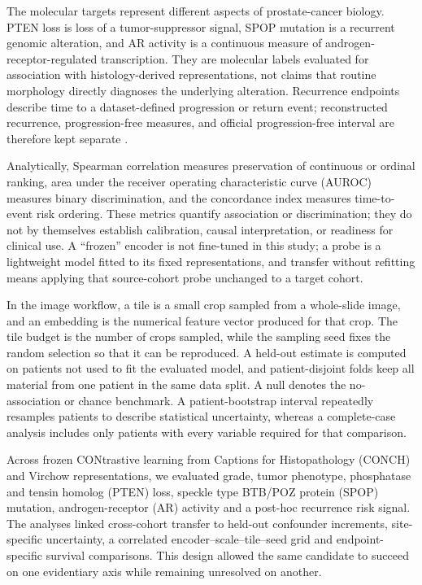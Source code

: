 The molecular targets represent different aspects of prostate-cancer biology. PTEN loss is
loss of a tumor-suppressor signal, SPOP mutation is a recurrent genomic alteration, and AR
activity is a continuous measure of androgen-receptor-regulated transcription. They are
molecular labels evaluated for association with histology-derived representations, not
claims that routine morphology directly diagnoses the underlying alteration. Recurrence
endpoints describe time to a dataset-defined progression or return event; reconstructed
recurrence, progression-free measures, and official progression-free interval are therefore
kept separate \cite{tcgaprad2015,tcgacdr2018}.

Analytically, Spearman correlation measures preservation of continuous or ordinal ranking,
area under the receiver operating characteristic curve (AUROC) measures binary
discrimination, and the concordance index measures time-to-event risk ordering. These
metrics quantify association or discrimination; they do not by themselves establish
calibration, causal interpretation, or readiness for clinical use. A ``frozen'' encoder is
not fine-tuned in this study; a probe is a lightweight
model fitted to its fixed representations, and transfer without refitting means applying
that source-cohort probe unchanged to a target cohort.

In the image workflow, a tile is a small crop sampled from a whole-slide image, and an
embedding is the numerical feature vector produced for that crop. The tile budget is the
number of crops sampled, while the sampling seed fixes the random selection so that it can
be reproduced. A held-out estimate is computed on patients not used to fit the evaluated
model, and patient-disjoint folds keep all material from one patient in the same data
split. A null denotes the no-association or chance benchmark. A patient-bootstrap interval
repeatedly resamples patients to describe statistical uncertainty, whereas a complete-case
analysis includes only patients with every variable required for that comparison.

Across frozen CONtrastive learning from Captions for Histopathology (CONCH) and Virchow
representations, we evaluated grade, tumor phenotype, phosphatase and tensin homolog (PTEN)
loss, speckle type BTB/POZ protein (SPOP) mutation, androgen-receptor (AR) activity and a
post-hoc recurrence risk signal. The analyses linked
cross-cohort transfer to held-out confounder increments, site-specific uncertainty, a
correlated encoder--scale--tile--seed grid and endpoint-specific survival comparisons. This
design allowed the same candidate to succeed on one evidentiary axis while remaining
unresolved on another.

